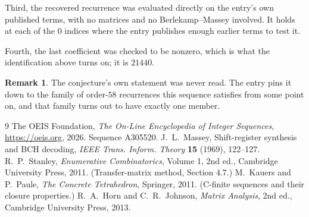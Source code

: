 \documentclass[11pt,a4paper]{article}
\theoremstyle{plain}
\theoremstyle{definition}
\newtheorem{remark}[theorem]{Remark}
\begin{document}
Third, the recovered recurrence was evaluated directly on the entry's own published terms, with
no matrices and no Berlekamp--Massey involved. It holds at each of the $0$ indices where
the entry publishes enough earlier terms to test it.

Fourth, the last coefficient was checked to be nonzero, which is what the identification above
turns on; it is $21440$.

\begin{remark}
The conjecture's own statement was never read. The entry pins it down to the family of
order-$58$ recurrences this sequence satisfies from some point on, and that family turns
out to have exactly one member.
\end{remark}

\begin{thebibliography}{9}
 The OEIS Foundation, \emph{The On-Line Encyclopedia of Integer
Sequences}, \url{https://oeis.org}, 2026. Sequence A305520.
 J.~L.~Massey, Shift-register synthesis and BCH decoding, \emph{IEEE
Trans. Inform. Theory} \textbf{15} (1969), 122--127.
 R.~P.~Stanley, \emph{Enumerative Combinatorics}, Volume 1, 2nd ed.,
Cambridge University Press, 2011. (Transfer-matrix method, Section 4.7.)
 M.~Kauers and P.~Paule, \emph{The Concrete Tetrahedron}, Springer, 2011.
(C-finite sequences and their closure properties.)
 R.~A.~Horn and C.~R.~Johnson, \emph{Matrix Analysis}, 2nd ed., Cambridge
University Press, 2013.
\end{thebibliography}
\end{document}
